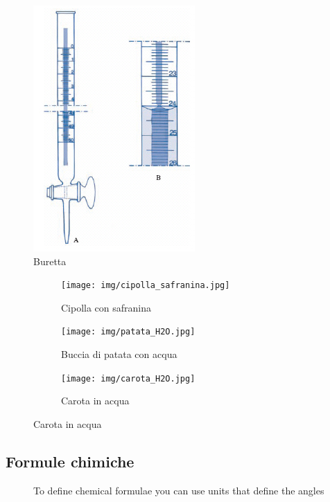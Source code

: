 \begin{figure}[h]
    \centering
    \includegraphics{img/buretta.jpg}
    \caption{Buretta}
    \label{fig:5}
\end{figure}

\begin{figure}[h!]
     \centering
     \begin{subfigure}[b]{0.29\textwidth}
         \centering
         \texttt{[image: img/cipolla\_safranina.jpg]}
         \caption{Cipolla con safranina}
         \label{fig:y equals x}
     \end{subfigure}
     \hfill
     \begin{subfigure}[b]{0.29\textwidth}
         \centering
         \texttt{[image: img/patata\_H2O.jpg]}
         \caption{Buccia di patata con acqua}
         \label{fig:three sin x}
     \end{subfigure}
     \hfill
     \begin{subfigure}[b]{0.29\textwidth}
         \centering
         \texttt{[image: img/carota\_H2O.jpg]}
         \caption{Carota in acqua}
         \label{fig:five over x}
     \end{subfigure}
        \label{fig:three graphs}
\end{figure}

\newpage
\subsection*{Formule chimiche}
\begin{figure}[!ht]
\end{figure}

\begin{figure}[!ht]
    \caption{To define chemical formulae you can use units that define the angles}
\end{figure}

